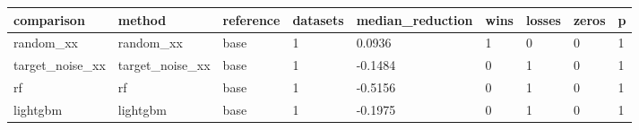 \begin{tabular}{lllllllll}
\toprule
comparison & method & reference & datasets & median\_reduction & wins & losses & zeros & p \\
\midrule
random\_xx & random\_xx & base & 1 & 0.0936 & 1 & 0 & 0 & 1 \\
target\_noise\_xx & target\_noise\_xx & base & 1 & -0.1484 & 0 & 1 & 0 & 1 \\
rf & rf & base & 1 & -0.5156 & 0 & 1 & 0 & 1 \\
lightgbm & lightgbm & base & 1 & -0.1975 & 0 & 1 & 0 & 1 \\
\bottomrule
\end{tabular}
